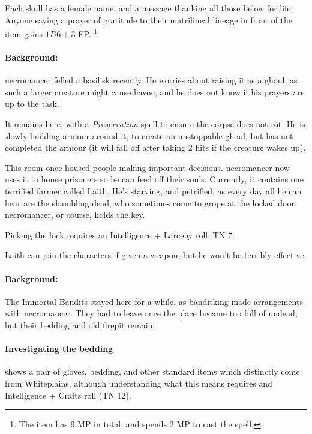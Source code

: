 \begin{multicols}{2}
Each skull has a female name, and a message thanking all those below for life.
Anyone saying a prayer of gratitude to their matrilineal lineage in front of the item gains $1D6+3$ FP.%
\footnote{The item has 9 MP in total, and spends 2 MP to cast the spell.}


\paragraph{Background:}
\Gls{necromancer} felled a basilisk recently.
He worries about raising it as a ghoul, as such a larger creature might cause havoc, and he does not know if his prayers are up to the task.

It remains here, with a \textit{Preservation} spell to ensure the corpse does not rot.
He is slowly building armour around it, to create an unstoppable ghoul, but has not completed the armour (it will fall off after taking 2 hits if the creature wakes up).


This room once housed people making important decisions.  \Gls{necromancer} now uses it to house prisoners so he can feed off their souls.
Currently, it contains one terrified farmer called Laith.
He's starving, and petrified, as every day all he can hear are the shambling dead, who sometimes come to grope at the locked door.
\Gls{necromancer}, or course, holds the key.

Picking the lock requires an Intelligence + Larceny roll, TN 7.

Laith can join the characters if given a weapon, but he won't be terribly effective.



\paragraph{Background:}
The Immortal Bandits stayed here for a while, as \gls{banditking} made arrangements with \gls{necromancer}.
They had to leave once the place became too full of undead, but their bedding and old firepit remain.

\paragraph{Investigating the bedding}
shows a pair of gloves, bedding, and other standard items which distinctly come from Whiteplains, although understanding what this means requires and Intelligence + Crafts roll (TN 12).


\end{multicols}
